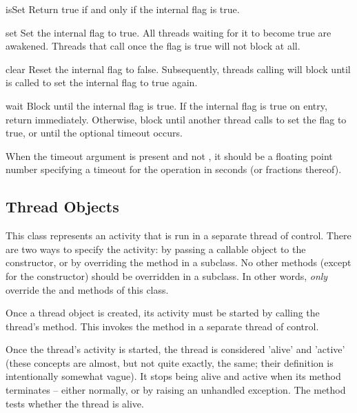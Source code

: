 \begin{methoddesc}{isSet}{}
Return true if and only if the internal flag is true.
\end{methoddesc}

\begin{methoddesc}{set}{}
Set the internal flag to true.
All threads waiting for it to become true are awakened.
Threads that call  once the flag is true will not block
at all.
\end{methoddesc}

\begin{methoddesc}{clear}{}
Reset the internal flag to false.
Subsequently, threads calling  will block until
 is called to set the internal flag to true again.
\end{methoddesc}

\begin{methoddesc}{wait}{}
Block until the internal flag is true.
If the internal flag is true on entry, return immediately.  Otherwise,
block until another thread calls  to set the flag to
true, or until the optional timeout occurs.

When the timeout argument is present and not , it should be a
floating point number specifying a timeout for the operation in
seconds (or fractions thereof).
\end{methoddesc}


\subsection{Thread Objects \label{thread-objects}}

This class represents an activity that is run in a separate thread
of control.  There are two ways to specify the activity: by
passing a callable object to the constructor, or by overriding the
 method in a subclass.  No other methods (except for the
constructor) should be overridden in a subclass.  In other words, 
\emph{only}  override the  and 
methods of this class.

Once a thread object is created, its activity must be started by
calling the thread's  method.  This invokes the
 method in a separate thread of control.

Once the thread's activity is started, the thread is considered
'alive' and 'active' (these concepts are almost, but not quite
exactly, the same; their definition is intentionally somewhat
vague).  It stops being alive and active when its 
method terminates -- either normally, or by raising an unhandled
exception.  The  method tests whether the thread is
alive.

